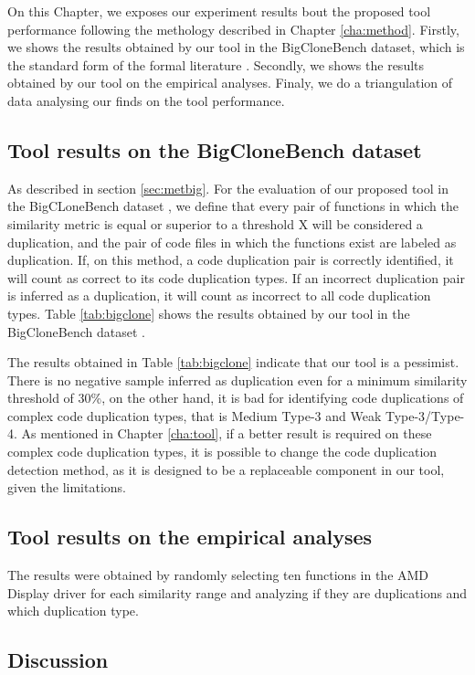 On this Chapter, we exposes our experiment results bout the proposed tool performance following
the methology described in Chapter \ref{cha:method}. Firstly, we shows the results obtained by our tool
in the BigCloneBench dataset\citep{bigclonebench}, which is the standard form of the formal literature 
\citep{litreview}. Secondly, we shows the results obtained by our tool on the empirical analyses. 
Finaly, we do a triangulation of data analysing our finds on the tool performance.

\subsection{Tool results on the BigCloneBench dataset}



As described in section \ref{sec:metbig}. For the evaluation of our proposed tool in the
BigCLoneBench dataset  \citep{bigclonebench}, we define that every pair of functions in which the 
similarity metric is equal or superior to a threshold X will be considered a duplication, and the 
pair of code files in which the functions exist are labeled as duplication. If, on this method, 
a code duplication pair is correctly identified, it will count as correct to its code duplication 
types. If an incorrect duplication pair is inferred as a duplication, it will count as incorrect 
to all code duplication types. Table \ref{tab:bigclone} shows the results obtained by our tool in the 
BigCloneBench dataset \citep{bigclonebench}.

The results obtained in Table \ref{tab:bigclone} indicate that our tool is a pessimist. There 
is no negative sample inferred as duplication even for a minimum similarity threshold of 30\%, 
on the other hand, it is bad for identifying code duplications of complex code duplication types, 
that is Medium Type-3 and Weak Type-3/Type-4. As mentioned in Chapter \ref{cha:tool}, if a 
better result is required on these complex code duplication types, it is possible to change 
the code duplication detection method, as it is designed to be a replaceable component in our 
tool, given the limitations.

\subsection{Tool results on the empirical analyses}



The results were obtained by randomly selecting ten functions in the AMD Display driver for 
each similarity range and analyzing if they are duplications and which duplication type.


\subsection{Discussion}
